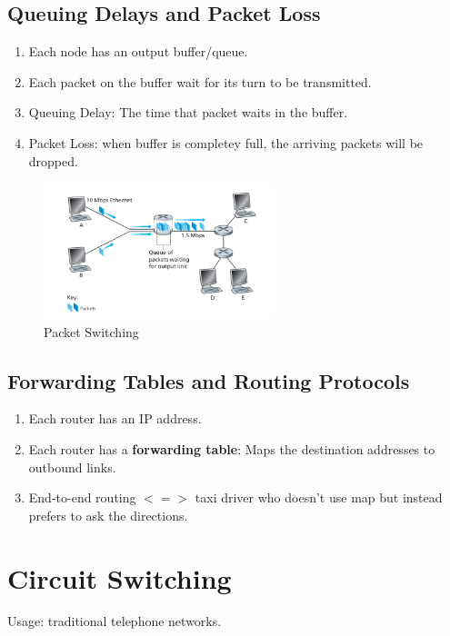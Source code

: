 \subsection{Queuing Delays and Packet Loss}

\begin{enumerate}
    \item Each node has an output buffer/queue.
    \item Each packet on the buffer wait for its turn to be transmitted.
    \item Queuing Delay: The time that packet waits in the buffer.
    \item Packet Loss: when buffer is completey full, the arriving packets will be dropped.
\end{enumerate}

\begin{figure}
    \centering
    \includegraphics[width=0.6\textwidth]{chapters/chapter1/PacketSwitching.png}
    \caption{Packet Switching}
    \label{c1_packetSwitching}
\end{figure}

\subsection{Forwarding Tables and Routing Protocols}

\begin{enumerate}
    \item Each router has an IP address.
    \item Each router has a \textbf{forwarding table}: Maps the destination addresses to outbound links.
    \item End-to-end routing $<=>$ taxi driver who doesn't use map but instead prefers to ask the directions.
\end{enumerate}


\section{Circuit Switching}
Usage: traditional telephone networks.

